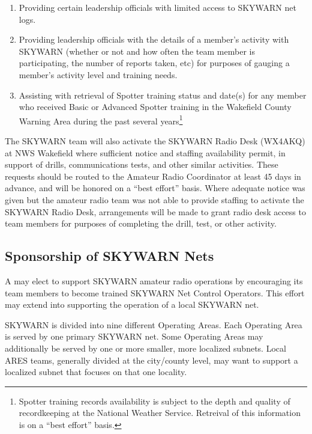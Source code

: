 \documentclass[pdflatex,letterpaper,twoside,12pt]{book}
\begin{document}
\begin{enumerate}
\item Providing certain \tpteam leadership officials with limited access to SKYWARN net logs.
\item Providing \tpteam leadership officials with the details of a member's activity with SKYWARN (whether or not and how often the team member is participating, the number of reports taken, etc) for purposes of gauging a member's activity level and training needs.
\item Assisting with retrieval of Spotter training status and date(s) for any \tpteam member who received Basic or Advanced Spotter training in the Wakefield County Warning Area during the past several years\footnote{Spotter training records availability is subject to the depth and quality of recordkeeping at the National Weather Service. Retreival of this information is on a ``best effort'' basis.}
\end{enumerate}

The SKYWARN team will also activate the SKYWARN Radio Desk (WX4AKQ) at NWS Wakefield where sufficient notice and staffing availability permit, in support of \tpteam drills, communications tests, and other similar activities.  These requests should be routed to the Amateur Radio Coordinator at least 45 days in advance, and will be honored on a ``best effort'' basis.  Where adequate notice was given but the amateur radio team was not able to provide staffing to activate the SKYWARN Radio Desk, arrangements will be made to grant radio desk access to \tpteam team members for purposes of completing the drill, test, or other activity.


\subsection{\tpteam Sponsorship of SKYWARN Nets}\label{sponsorship-of-nets}

A \tpteam may elect to support SKYWARN amateur radio operations by encouraging its team members to become trained SKYWARN Net Control Operators.  This effort may extend into supporting the operation of a local SKYWARN net.

SKYWARN is divided into nine different Operating Areas.  Each Operating Area is served by one primary SKYWARN net.  Some Operating Areas may additionally be served by one or more smaller, more localized subnets.  Local ARES teams, generally divided at the city/county level, may want to support a localized subnet that focuses on that one locality.
\end{document}
